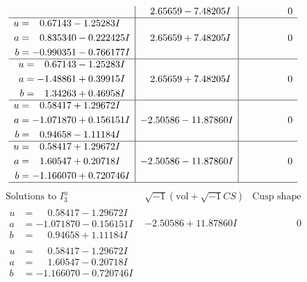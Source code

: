 \documentclass[1p]{elsarticle_modified}
\theoremstyle{definition}
\newcommand{\I}{\sqrt{-1}}
\begin{document}
$$\begin{array}{c|c|c}
 & \phantom{-}2.65659 - 7.48205 I & \phantom{-0.000000 } 0 \\ \hline\begin{aligned}
u &= \phantom{-}0.67143 - 1.25283 I \\
a &= \phantom{-}0.835340 - 0.222425 I \\
b &= -0.990351 - 0.766177 I\end{aligned}
 & \phantom{-}2.65659 + 7.48205 I & \phantom{-0.000000 } 0 \\ \hline\begin{aligned}
u &= \phantom{-}0.67143 - 1.25283 I \\
a &= -1.48861 + 0.39915 I \\
b &= \phantom{-}1.34263 + 0.46958 I\end{aligned}
 & \phantom{-}2.65659 + 7.48205 I & \phantom{-0.000000 } 0 \\ \hline\begin{aligned}
u &= \phantom{-}0.58417 + 1.29672 I \\
a &= -1.071870 + 0.156151 I \\
b &= \phantom{-}0.94658 - 1.11184 I\end{aligned}
 & -2.50586 - 11.87860 I & \phantom{-0.000000 } 0 \\ \hline\begin{aligned}
u &= \phantom{-}0.58417 + 1.29672 I \\
a &= \phantom{-}1.60547 + 0.20718 I \\
b &= -1.166070 + 0.720746 I\end{aligned}
 & -2.50586 - 11.87860 I & \phantom{-0.000000 } 0\\
 \hline 
 \end{array}$$\newpage$$\begin{array}{c|c|c}  
\text{Solutions to }I^u_{3}& \I (\text{vol} + \sqrt{-1}CS) & \text{Cusp shape}\\
 \hline 
\begin{aligned}
u &= \phantom{-}0.58417 - 1.29672 I \\
a &= -1.071870 - 0.156151 I \\
b &= \phantom{-}0.94658 + 1.11184 I\end{aligned}
 & -2.50586 + 11.87860 I & \phantom{-0.000000 } 0 \\ \hline\begin{aligned}
u &= \phantom{-}0.58417 - 1.29672 I \\
a &= \phantom{-}1.60547 - 0.20718 I \\
b &= -1.166070 - 0.720746 I\end{aligned}

\end{array}$$
\end{document}
